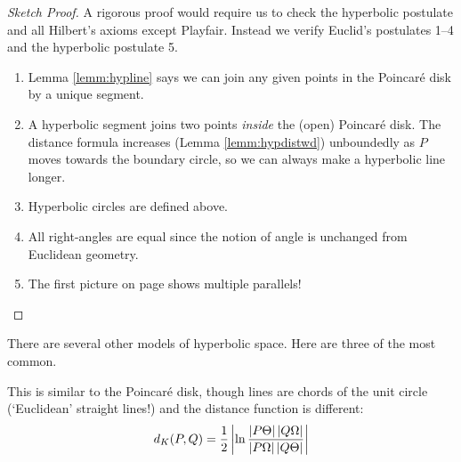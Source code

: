 \begin{proof}[Sketch Proof]
	A rigorous proof would require us to check the hyperbolic postulate and all Hilbert's axioms except Playfair. Instead we verify Euclid's postulates 1--4 and the hyperbolic postulate 5.
	\begin{enumerate}\itemsep0pt
	  \item Lemma \ref{lemm:hypline} says we can join any given points in the Poincaré disk by a unique segment.
	  \item A hyperbolic segment joins two points \emph{inside} the (open) Poincaré disk. The distance formula increases (Lemma \ref{lemm:hypdistwd}) unboundedly as $P$ moves towards the boundary circle, so we can always make a hyperbolic line longer.
	  \item Hyperbolic circles are defined above.
	  \item All right-angles are equal since the notion of angle is unchanged from Euclidean geometry.
	  \item The first picture on page \pageref{sec:hyp-models} shows multiple parallels!\hfill{\qedhere}
	\end{enumerate}
\end{proof}

\goodbreak




There are several other models of hyperbolic space. Here are three of the most common.%

 This is similar to the Poincaré disk, though lines are chords of the unit circle (`Euclidean' straight lines!) and the distance function is different:
\[
	d_K(P,Q) =\frac 12\left| \ln\frac{\left| P\Theta\right|\left| Q\Omega\right|}{\left| P\Omega\right|\left| Q\Theta\right|}\right|
\]

